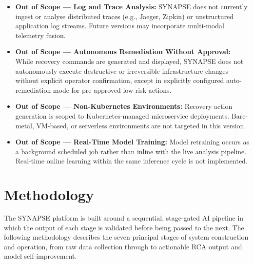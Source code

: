 \begin{itemize}
    \item \textbf{Out of Scope — Log and Trace Analysis:} SYNAPSE does not currently ingest or analyse distributed traces (e.g., Jaeger, Zipkin) or unstructured application log streams. Future versions may incorporate multi-modal telemetry fusion.

    \item \textbf{Out of Scope — Autonomous Remediation Without Approval:} While recovery commands are generated and displayed, SYNAPSE does not autonomously execute destructive or irreversible infrastructure changes without explicit operator confirmation, except in explicitly configured auto-remediation mode for pre-approved low-risk actions.

    \item \textbf{Out of Scope — Non-Kubernetes Environments:} Recovery action generation is scoped to Kubernetes-managed microservice deployments. Bare-metal, VM-based, or serverless environments are not targeted in this version.

    \item \textbf{Out of Scope — Real-Time Model Training:} Model retraining occurs as a background scheduled job rather than inline with the live analysis pipeline. Real-time online learning within the same inference cycle is not implemented.
\end{itemize}

\section{Methodology}

\hspace*{0.3in} The SYNAPSE platform is built around a sequential, stage-gated AI pipeline in which the output of each stage is validated before being passed to the next. The following methodology describes the seven principal stages of system construction and operation, from raw data collection through to actionable RCA output and model self-improvement.\\


